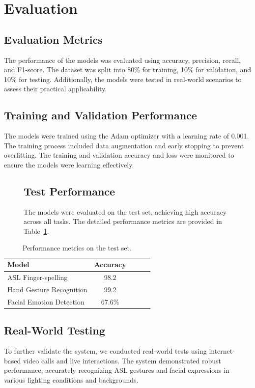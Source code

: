 \documentclass{article}
\begin{document}
\section{Evaluation}

\subsection{Evaluation Metrics}
The performance of the models was evaluated using accuracy, precision, recall, and F1-score. The dataset was split into 80\% for training, 10\% for validation, and 10\% for testing. Additionally, the models were tested in real-world scenarios to assess their practical applicability.

\subsection{Training and Validation Performance}
The models were trained using the Adam optimizer with a learning rate of 0.001. The training process included data augmentation and early stopping to prevent overfitting. The training and validation accuracy and loss were monitored to ensure the models were learning effectively.

\begin{figure}[h]

\subsection{Test Performance}
The models were evaluated on the test set, achieving high accuracy across all tasks. The detailed performance metrics are provided in Table~\ref{tab:performance-metrics}.
\end{figure}
\begin{table}[h]
    \centering
    \caption{Performance metrics on the test set.}
    \label{tab:performance-metrics}
    \begin{tabular}{lcccc}
		\hline %
        Model & Accuracy \\
        \hline
        ASL Finger-spelling & 98.2 \\
        Hand Gesture Recognition & 99.2 \\
        Facial Emotion Detection & 67.6\%  \\
        \hline
    \end{tabular}
\end{table}

\subsection{Real-World Testing}
To further validate the system, we conducted real-world tests using internet-based video calls and live interactions. The system demonstrated robust performance, accurately recognizing ASL gestures and facial expressions in various lighting conditions and backgrounds.
\end{document}
